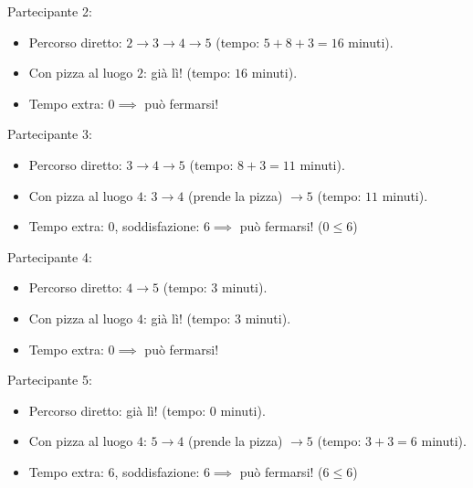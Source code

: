 Partecipante 2:
\begin{itemize}
    \item Percorso diretto: $2 \to 3 \to 4 \to 5$ (tempo: $5+8+3 = 16$ minuti).
    \item Con pizza al luogo $2$: già lì! (tempo: $16$ minuti).
    \item Tempo extra: $0 \implies$ può fermarsi! \checkmark
\end{itemize}

Partecipante 3:
\begin{itemize}
    \item Percorso diretto: $3 \to 4 \to 5$ (tempo: $8+3 = 11$ minuti).
    \item Con pizza al luogo $4$: $3 \to 4$ (prende la pizza) $\to 5$ (tempo: $11$ minuti).
    \item Tempo extra: $0$, soddisfazione: $6 \implies$ può fermarsi! ($0 \le 6$) \checkmark
\end{itemize}

Partecipante 4:
\begin{itemize}
    \item Percorso diretto: $4 \to 5$ (tempo: $3$ minuti).
    \item Con pizza al luogo $4$: già lì! (tempo: $3$ minuti).
    \item Tempo extra: $0 \implies$ può fermarsi! \checkmark
\end{itemize}

Partecipante 5:
\begin{itemize}
    \item Percorso diretto: già lì! (tempo: $0$ minuti).
    \item Con pizza al luogo $4$: $5 \to 4$ (prende la pizza) $\to 5$ (tempo: $3+3=6$ minuti).
    \item Tempo extra: $6$, soddisfazione: $6 \implies$ può fermarsi! ($6 \le 6$) \checkmark
\end{itemize}
